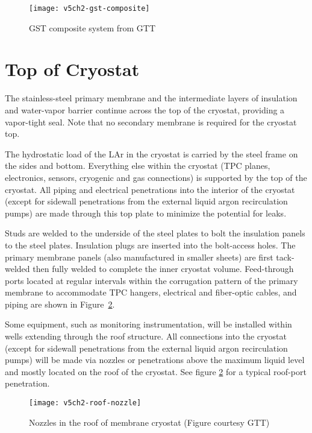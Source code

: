 \begin{figure}[htbp]
\centering
\texttt{[image: v5ch2-gst-composite]}
\caption{GST composite system from GTT}
\label{fig:gst-composite}
\end{figure}

\section{Top of Cryostat}

The stainless-steel primary membrane and the intermediate layers of 
insulation and water-vapor barrier continue across the top of the 
cryostat, providing a vapor-tight seal.  Note that no secondary 
membrane is required for the cryostat top. 

The hydrostatic load of the LAr in the cryostat is carried by 
the steel frame on the sides and bottom. Everything 
else within the cryostat (TPC planes, electronics, sensors,
cryogenic and gas connections) is supported by the top of the 
cryostat. All piping and electrical penetrations into the 
interior of the cryostat (except for sidewall penetrations from
the external liquid argon recirculation pumps) are made through 
this top plate to minimize the potential for leaks.

Studs are welded to the underside of the steel plates to bolt the 
insulation panels to the steel plates. Insulation plugs are inserted 
into the bolt-access holes.  The primary membrane panels (also 
manufactured in smaller sheets) are first tack-welded then fully 
welded to complete the inner cryostat volume. Feed-through 
ports located at regular intervals within the corrugation pattern
of the primary membrane to accommodate TPC hangers, electrical 
and fiber-optic cables, and piping are
shown in Figure~\ref{fig:v5ch2-roof-nozzle}. 

Some equipment, such as monitoring instrumentation, 
will be installed within wells extending through the roof 
structure. All connections into the cryostat (except for 
sidewall penetrations from the external liquid argon 
recirculation pumps) will be made 
via nozzles or penetrations above the maximum liquid level 
and mostly located on the roof of the cryostat. See figure 
\ref{fig:v5ch2-roof-nozzle} for a typical roof-port 
penetration.  

\begin{figure}[htbp]
\centering
\texttt{[image: v5ch2-roof-nozzle]} 
\caption[Nozzles in the roof of membrane cryostat]{Nozzles in the roof of membrane cryostat (Figure courtesy GTT)}
\label{fig:v5ch2-roof-nozzle}
\end{figure}



